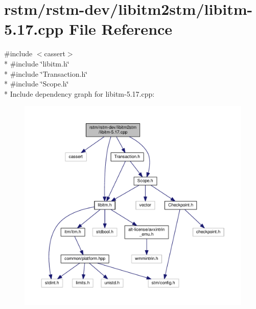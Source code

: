 \hypertarget{libitm-5_817_8cpp}{\section{rstm/rstm-\/dev/libitm2stm/libitm-\/5.17.cpp File Reference}
\label{libitm-5_817_8cpp}
}
{\ttfamily \#include $<$cassert$>$}\\*
{\ttfamily \#include \char`\"{}libitm.\-h\char`\"{}}\\*
{\ttfamily \#include \char`\"{}Transaction.\-h\char`\"{}}\\*
{\ttfamily \#include \char`\"{}Scope.\-h\char`\"{}}\\*
Include dependency graph for libitm-\/5.17.cpp\-:
\nopagebreak
\begin{figure}[H]
\begin{center}
\leavevmode
\includegraphics[width=350pt]{libitm-5_817_8cpp__incl}
\end{center}
\end{figure}
